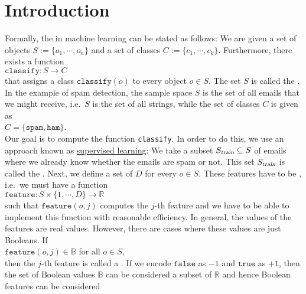 \section{Introduction}
Formally, the   
in machine learning can be stated as follows:  We are given a
set of objects $S := \{ o_1, \cdots, o_n \}$ and a set of classes $C := \{ c_1, \cdots, c_k \}$.  Furthermore, there exists a function 
\\[0.2cm]
\hspace*{1.3cm}
$\mathtt{classify}: S \rightarrow C$
\\[0.2cm]
that assigns a class $\texttt{classify}(o)$ to every object $o \in S$.  The set $S$ is called the .
In the example of spam detection, the sample space $S$ is the set of all emails that we might receive, i.e.~$S$
is the set of all strings, while the set of classes $C$ is given as
\\[0.2cm]
\hspace*{1.3cm}
$C = \{ \mathtt{spam}, \mathtt{ham} \}$.
\\[0.2cm]
Our goal is to compute the function \texttt{classify}.  In order to do this, we use an approach known as
\href{https://en.wikipedia.org/wiki/Supervised_learning}{supervised learning}:  We take a subset $S_\textsl{train} \subseteq S$ of
emails where we already know whether the emails are spam or not.  This set $S_\textsl{train}$ is called the
. 
Next, we define a set of $D$  for every $o \in S$.  These features have to be ,
i.e.~we must have a function
\\[0.2cm]
\hspace*{1.3cm}
$\mathtt{feature}: S \times \{ 1, \cdots, D \} \rightarrow \mathbb{R}$ 
\\[0.2cm]
such that $\mathtt{feature}(o, j)$ computes the $j$-th feature and we have to be able to implement
this function with reasonable efficiency.  In general, the values of the features are real values.
However, there are cases where these values are just 
Booleans.  If
\\[0.2cm]
\hspace*{1.3cm}
$\texttt{feature}(o, j) \in \mathbb{B}$ \quad for all $o \in S$,
\\[0.2cm]
then the $j$-th feature is called a .  
If we encode $\mathtt{false}$ as $-1$ and $\mathtt{true}$ as
$+1$, then the set of Boolean values $\mathbb{B}$ can be considered a subset of $\mathbb{R}$ and hence Boolean features can be considered
